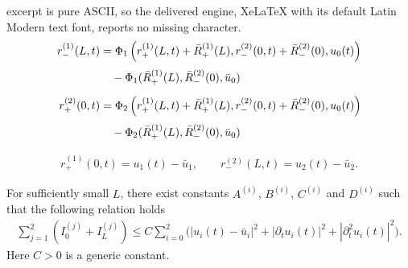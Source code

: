 \documentclass[10pt,a4paper]{amsart}
\begin{document}
excerpt is pure ASCII, so the delivered engine, XeLaTeX with its default Latin Modern text font, reports no missing character.
\begin{align}
    r_-^{(1)}(L,t)&=\Phi_1\left({r}_+^{(1)}(L,t)+\bar{R}_+^{(1)}(L),{r}_-^{(2)}(0,t)+\bar{R}_-^{(2)}(0),u_0(t)\right)\notag \\[1mm]
    &\quad -\Phi_1(\bar{R}_+^{(1)}(L),\bar{R}_-^{(2)}(0),\bar{u}_0) \label{eq1.11}\\[2mm]
    r_+^{(2)}(0,t)&=\Phi_2\left({r}_+^{(1)}(L,t)+\bar{R}_+^{(1)}(L),{r}_-^{(2)}(0,t)+\bar{R}_-^{(2)}(0),u_0(t)\right)\notag \\[1mm]
    &\quad -\Phi_2(\bar{R}_+^{(1)}(L),\bar{R}_-^{(2)}(0),\bar{u}_0)  \label{eq1.12}
\end{align}

\begin{align}\label{eq1.13}
    r_+^{(1)}(0,t)=u_1(t)-\bar{u}_1,\qquad
    r_-^{(2)}(L,t)=u_2(t)-\bar{u}_2.
\end{align}

\begin{lemma}
For sufficiently small $L$, there exist constants $A^{(i)}$, $B^{(i)}$, $C^{(i)}$ and $D^{(i)}$ such that the following relation holds 
\begin{align}\label{lemma3.2-eq1} 
\sum_{j=1}^2\left(I^{(j)}_0+I^{(j)}_L\right)\leq C\sum_{i=0}^2\Big(|u_i(t)-\bar{u}_i|^2+|\partial_tu_i(t)|^2+|\partial_t^2u_i(t)|^2\Big).
\end{align}
Here $C>0$ is a generic constant.
\end{lemma}
\end{document}
